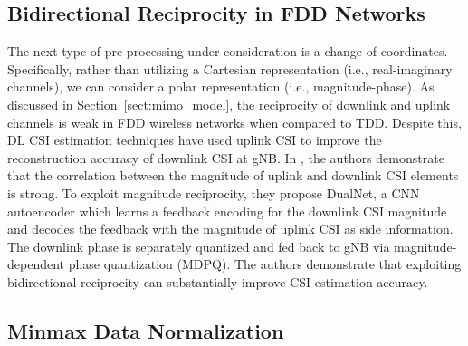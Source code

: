 
\subsection{Bidirectional Reciprocity in FDD Networks}

The next type of pre-processing under consideration is a change of coordinates. Specifically, rather than utilizing a Cartesian representation (i.e., real-imaginary channels), we can consider a polar representation (i.e., magnitude-phase). As discussed in Section~\ref{sect:mimo_model}, the reciprocity of downlink and uplink channels is weak in FDD wireless networks when compared to TDD. Despite this, DL CSI estimation techniques have used uplink CSI to improve the reconstruction accuracy of downlink CSI at gNB. In \cite{ref:dualnet}, the authors demonstrate that the correlation between the magnitude of uplink and downlink CSI elements is strong. To exploit magnitude reciprocity, they propose DualNet, a CNN autoencoder which learns a feedback encoding for the downlink CSI magnitude and decodes the feedback with the magnitude of uplink CSI as side information. The downlink phase is separately quantized and fed back to gNB via magnitude-dependent phase quantization (MDPQ). The authors demonstrate that exploiting bidirectional reciprocity can substantially improve CSI estimation accuracy.

\subsection{Minmax Data Normalization}

